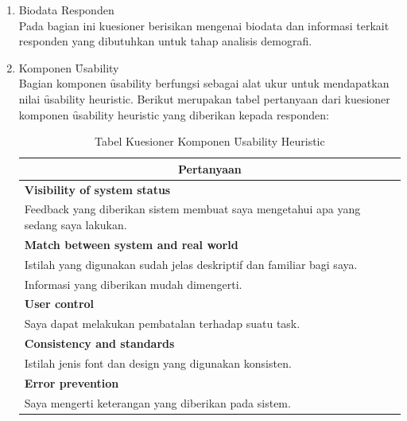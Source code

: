 \begin{enumerate}
	\item Biodata Responden\\
	Pada bagian ini kuesioner berisikan mengenai biodata dan informasi terkait responden yang dibutuhkan untuk tahap analisis demografi.
	\item Komponen \f{Usability}\\
	Bagian komponen \f{usability} berfungsi sebagai alat ukur untuk mendapatkan nilai \f{usability heuristic}. Berikut merupakan tabel pertanyaan dari kuesioner komponen \f{usability heuristic} yang diberikan kepada responden:
\begin{center}
	\begin{longtable}{|p{11.2cm}|}
		\caption{Tabel Kuesioner Komponen \f{Usability Heuristic}}	\\	
			\hline
			\multicolumn{1}{|c|}{{\bf Pertanyaan}}\\ 
			\hline
			{\bf Visibility of system status}                                                                           \\
			Feedback yang diberikan sistem membuat saya mengetahui apa yang sedang saya lakukan.                        \\ \hline
			{\bf Match between system and real world}                                                                   \\
			Istilah yang digunakan sudah jelas deskriptif dan familiar bagi saya.                                       \\
			Informasi yang diberikan mudah dimengerti.                                                                  \\ \hline
			{\bf User control}                                                                                          \\
			Saya dapat melakukan pembatalan terhadap suatu task.                                                        \\ \hline
			{\bf Consistency and standards}                                                                             \\
			Istilah jenis font dan design yang digunakan konsisten.                                                     \\ \hline
			{\bf Error prevention}                                                                                      \\
			Saya mengerti keterangan yang diberikan pada sistem.                                                        \\

\end{longtable}
\end{center}
\end{enumerate}
